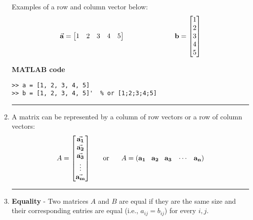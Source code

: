 \begin{enumerate}
\begin{example} Examples of a row and column vector below:
\[
\vec{{\bf a}} = \begin{bmatrix} 1 & 2 &  3 & 4 & 5 \end{bmatrix} \hspace{1in} {\bf b} = \begin{bmatrix} 1 \\  2 \\ 3 \\ 4 \\ 5 \end{bmatrix} 
\]
\end{example}

\textbf{MATLAB code}
\begin{verbatim}
>> a = [1, 2, 3, 4, 5]
>> b = [1, 2, 3, 4, 5]'  % or [1;2;3;4;5]
\end{verbatim}



\rule[0.01in]{\textwidth}{0.0025in}



\item A matrix can be represented by a column of row vectors or a row of column vectors:
\[
A = \begin{bmatrix} \vec{{\bf a_1}}\\ \vec{{\bf a_2}} \\ \vec{{\bf a_3}} \\ \vdots \\ \vec{{\bf a_m}} \end{bmatrix}     \hspace{0.5cm} \text{ or } \hspace{0.5cm}      A=({\bf a_1} \;\; \;{\bf a_2} \; \;\; {\bf a_3} \; \;\; \cdots \; \;\; {\bf a_n})
\]


\rule[0.01in]{\textwidth}{0.0025in}














\item \textbf{Equality} - Two matrices $A$ and $B$ are equal if they are the same size and their corresponding entries are equal (i.e., $a_{ij} = b_{ij}$) for every $i, j$.  


\end{enumerate}
